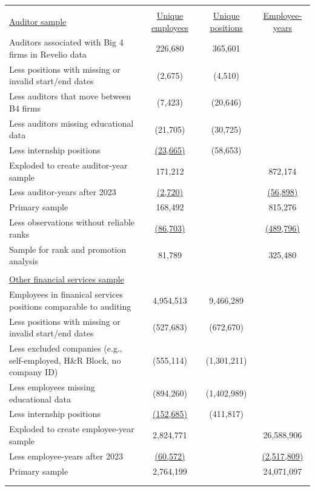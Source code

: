 \begin{tabular}{ l c c c}\\[-1.8ex]\hline \hline \\[-1.8ex]\underline{Auditor sample}& \underline{Unique employees} & \underline{Unique positions} & \underline{Employee-years} \\Auditors associated with Big 4 firms in Revelio data & 226,680 & 365,601 & \\ \quad Less positions with missing or invalid start/end dates &(2,675) & (4,510) & \\ \quad Less auditors that move between B4 firms &(7,423) & (20,646) & \\ \quad Less auditors missing educational data &(21,705) & (30,725) & \\ \quad Less internship positions &\underline{(23,665)} & (58,653) & \\ Exploded to create auditor-year sample &171,212 &  & 872,174\\ \quad Less auditor-years after 2023 &\underline{(2,720)} & & \underline{(56,898)}\\ Primary sample &168,492& &815,276\\ \quad Less observations without reliable ranks &\underline{(86,703)} & & \underline{(489,796)}\\ Sample for rank and promotion analysis &81,789 &  & 325,480\\\\ \underline{Other financial services sample} & & &\\Employees in finanical services positions comparable to auditing & 4,954,513 & 9,466,289 & \\ \quad Less positions with missing or invalid start/end dates &(527,683) & (672,670) & \\ \quad Less excluded companies (e.g., self-employed, H\&R Block, no company ID) &(555,114) & (1,301,211) & \\ \quad Less employees missing educational data &(894,260) & (1,402,989) & \\ \quad Less internship positions &\underline{(152,685)} & (411,817) & \\ Exploded to create employee-year sample &2,824,771 &  & 26,588,906\\ \quad Less employee-years after 2023 &\underline{(60,572)} & & \underline{(2,517,809)}\\ Primary sample &2,764,199& &24,071,097\\\\[-1.8ex]\hline \hline \\[-1.8ex]\end{tabular}